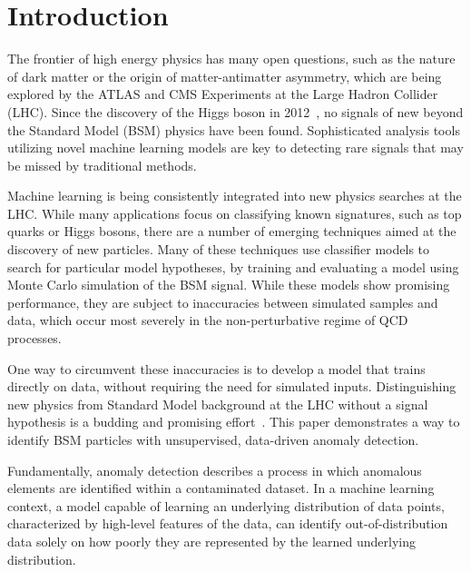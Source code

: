 \documentclass[12pt, a4paper]{article}
\begin{document}
\clearpage







\section{Introduction}

The frontier of high energy physics has many open questions, such as the nature of dark matter or the origin of matter-antimatter asymmetry, which are being explored by the ATLAS and CMS Experiments at the Large Hadron Collider (LHC). 
Since the discovery of the Higgs boson in 2012~\cite{atlas_higgs,cms_higgs}, no signals of new beyond the Standard Model (BSM) physics have been found. 
Sophisticated analysis tools utilizing novel machine learning models are key to detecting rare signals that may be missed by traditional methods. 

Machine learning is being consistently integrated into new physics searches at the LHC. 
While many applications focus on classifying known signatures, such as top quarks or Higgs bosons, there are a number of emerging techniques aimed at the discovery of new particles. 
Many of these techniques use classifier models to search for particular model hypotheses, by training and evaluating a model using Monte Carlo simulation of the BSM signal.
While these models show promising performance, they are subject to inaccuracies between simulated samples and data, which occur most severely in the non-perturbative regime of QCD processes.

One way to circumvent these inaccuracies is to develop a model that trains directly on data, without requiring the need for simulated inputs.
Distinguishing new physics from Standard Model background at the LHC without a signal hypothesis is a budding and promising effort~\cite{CWoLa}. 
This paper demonstrates a way to identify BSM particles with unsupervised, data-driven anomaly detection. 

Fundamentally, anomaly detection describes a process in which anomalous elements are identified within a contaminated dataset. 
In a machine learning context, a model capable of learning an underlying distribution of data points, characterized by high-level features of the data, can identify out-of-distribution data solely on how poorly they are represented by the learned underlying distribution. 
\end{document}
